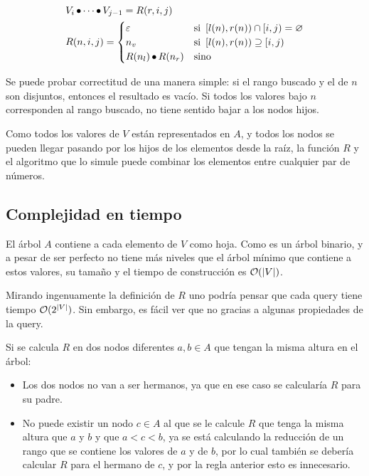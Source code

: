 \[
\begin{split}
	& V_i \operatorname{\bullet} \cdots \operatorname{\bullet} V_{j - 1} = R(r, i, j) \\
	& R(n, i, j) =
	\begin{cases}
		\mathbf{\varepsilon} &\text{si } \left[l(n), r(n)\right) \cap \left[i, j\right) = \varnothing \\
		n_v &\text{si } \left[l(n), r(n)\right) \supseteq \left[i, j\right) \\
		R(n_l) \operatorname{\bullet} R(n_r) &\text{sino}
	\end{cases}
\end{split}
\]

Se puede probar correctitud de una manera simple: si el rango buscado y el de \(n\) son disjuntos, entonces el resultado es vacío. Si todos los valores bajo \(n\) corresponden al rango buscado, no tiene sentido bajar a los nodos hijos.

Como todos los valores de \(V\) están representados en \(A\), y todos los nodos se pueden llegar pasando por los hijos de los elementos desde la raíz, la función \(R\) y el algoritmo que lo simule puede combinar los elementos entre cualquier par de números.

\subsection{Complejidad en tiempo}

El árbol \(A\) contiene a cada elemento de \(V\) como hoja. Como es un árbol binario, y a pesar de ser perfecto no tiene más niveles que el árbol mínimo que contiene a estos valores, su tamaño y el tiempo de construcción es \(\mathcal{O}(\left|V\right|)\).

Mirando ingenuamente la definición de \(R\) uno podría pensar que cada query tiene tiempo \(\mathcal{O}(2^{\left|V\right|})\). Sin embargo, es fácil ver que no gracias a algunas propiedades de la query.

Si se calcula \(R\) en dos nodos diferentes \(a, b \in A\) que tengan la misma altura en el árbol:
\begin{itemize}
	\item Los dos nodos no van a ser hermanos, ya que en ese caso se calcularía \(R\) para su padre.
	\item No puede existir un nodo \(c \in A\) al que se le calcule \(R\) que tenga la misma altura que \(a\) y \(b\) y que \(a < c < b\), ya se está calculando la reducción de un rango que se contiene los valores de \(a\) y de \(b\), por lo cual también se debería calcular \(R\) para el hermano de \(c\), y por la regla anterior esto es innecesario.
\end{itemize}

